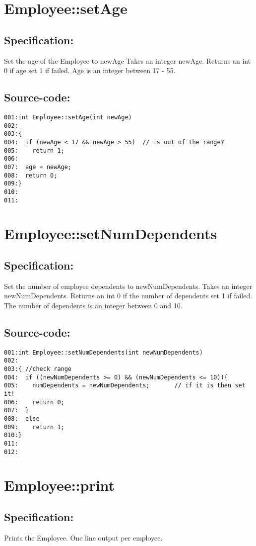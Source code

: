 \section{Employee::setAge}
\subsection*{Specification:}
Set the age of the Employee to newAge
  Takes an integer newAge.
  Returns an int 0 if age set 1 if failed.
  Age is an integer between 17 - 55.
\subsection*{Source-code:}
\begin{verbatim}
001:int Employee::setAge(int newAge)    
002:  
003:{
004:  if (newAge < 17 && newAge > 55)  // is out of the range?
005:    return 1;
006:
007:  age = newAge;          
008:  return 0;
009:}
010:
011:
\end{verbatim}
\section{Employee::setNumDependents}
\subsection*{Specification:}
Set the number of employee dependents to newNumDependents.
  Takes an integer newNumDependents.
  Returns an int 0 if the number of dependents set 1 if failed.
  The number of dependents is an integer between 0 and 10.
\subsection*{Source-code:}
\begin{verbatim}
001:int Employee::setNumDependents(int newNumDependents) 
002:  
003:{ //check range 
004:  if ((newNumDependents >= 0) && (newNumDependents <= 10)){ 
005:    numDependents = newNumDependents;       // if it is then set it!
006:    return 0;
007:  }
008:  else
009:    return 1;
010:}
011:
012:
\end{verbatim}
\section{Employee::print}
\subsection*{Specification:}
Prints the Employee. One line output per employee.
